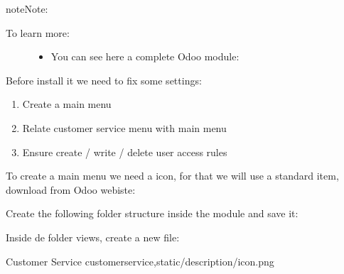 \documentclass[letterpaper,10pt,english]{sphinxmanual}
\begin{document}
\begin{sphinxadmonition}{note}{Note:}\begin{description}
\item[{To learn more:}] \leavevmode\begin{itemize}
\item {} 
You can see here a complete Odoo module: 

\end{itemize}

\end{description}
\end{sphinxadmonition}

Before install it we need to fix some settings:
\begin{enumerate}
%
\item {} 
Create a main menu

\item {} 
Relate customer service menu with main menu

\item {} 
Ensure create / write / delete user access rules

\end{enumerate}

To create a main menu we need a icon, for that we will use a standard item, download from Odoo webiste:

Create the following folder structure inside the module and save it: 

Inside de folder views, create a new file: 

\begin{sphinxVerbatim}[commandchars=\\\{\}]
      
         Customer Service
          
         customer\PYGZus{}service,static/description/icon.png
\end{sphinxVerbatim}
\end{document}
